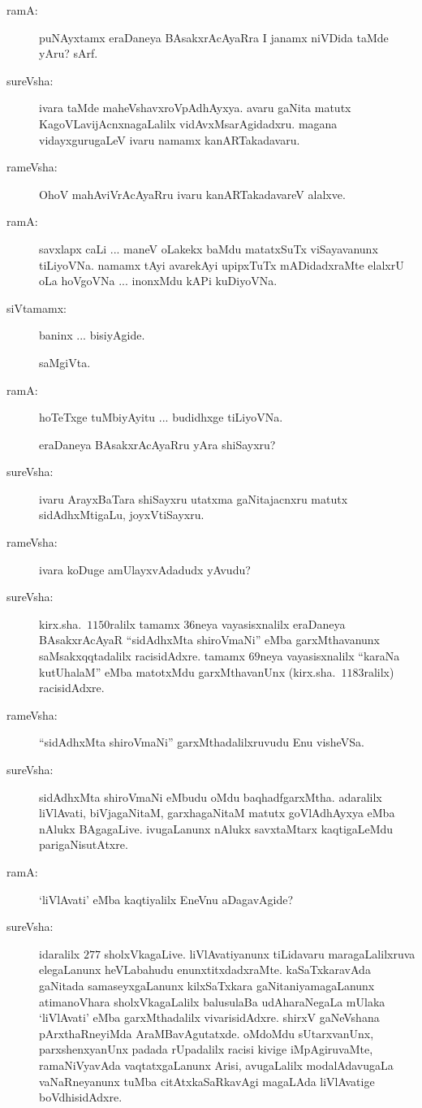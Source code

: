 \begin{description}
\item[ramA:] puNAyxtamx eraDaneya BAsakxrAcAyaRra I janamx niVDida taMde yAru? sArf.

\item[sureVsha:] ivara taMde maheVshavxroVpAdhAyxya. avaru gaNita matutx KagoVLa\-vijAcnxnagaLalilx vidAvxMsarAgidadxru. magana vidayxgurugaLeV ivaru namamx kanARTakadavaru.

\item[rameVsha:] OhoV mahAviVrAcAyaRru ivaru kanARTakadavareV alalxve.

\item[ramA:] savxlapx caLi ... maneV oLakekx baMdu matatxSuTx viSayavanunx tiLiyoVNa. namamx tAyi avarekAyi upipxTuTx mADidadxraMte elalxrU oLa hoVgoVNa ... inonxMdu kAPi kuDiyoVNa.

\item[siVtamamx:] baninx ... bisiyAgide.

saMgiVta.

\item[ramA:] hoTeTxge tuMbiyAyitu ... budidhxge tiLiyoVNa.

eraDaneya BAsakxrAcAyaRru yAra shiSayxru?

\item[sureVsha:] ivaru ArayxBaTara shiSayxru utatxma gaNitajacnxru matutx sidAdhxMtigaLu, joyxVtiSayxru.

\item[rameVsha:] ivara koDuge amUlayxvAdadudx yAvudu?

\item[sureVsha:] kirx.sha.\ $1150$ralilx tamamx $36$neya vayasisxnalilx eraDaneya BAsakxrAcAyaR ``sidAdhxMta shiroVmaNi'' eMba garxMthavanunx saMsakxqqtadalilx racisidAdxre. tamamx $69$neya vayasisxnalilx ``karaNa kutUhalaM'' eMba matotxMdu garxMthavanUnx (kirx.sha.\ $1183$ralilx) racisidAdxre.

\item[rameVsha:] ``sidAdhxMta shiroVmaNi'' garxMthadalilxruvudu Enu visheVSa.

\item[sureVsha:] sidAdhxMta shiroVmaNi eMbudu oMdu baqhadfgarxMtha. adaralilx liVlAvati, biVjagaNitaM, garxhagaNitaM matutx goVlAdhAyxya eMba nAlukx BAgagaLive. ivugaLanunx nAlukx savxtaMtarx kaqtigaLeMdu parigaNisutAtxre.

\item[ramA:] `liVlAvati' eMba kaqtiyalilx EneVnu aDagavAgide?

\item[sureVsha:] idaralilx $277$ sholxVkagaLive. liVlAvatiyanunx tiLidavaru maragaLalilxruva elegaLanunx heVLabahudu enunxtitxdadxraMte. kaSaTxkaravAda gaNitada samaseyx\break gaLanunx kilxSaTxkara gaNitaniyamagaLanunx atimanoVhara sholxVkagaLalilx balu\break sulaBa udAharaNegaLa mUlaka `liVlAvati' eMba garxMthadalilx vivarisidAdxre. shirxV gaNeVshana pArxthaRneyiMda AraMBavAgutatxde. oMdoMdu sUtarxvanUnx,\- parxshenxyanUnx padada rUpadalilx racisi kivige iMpAgiruvaMte, ramaNiVya\-vAda vaqtatxgaLanunx Arisi, avugaLalilx modalAdavugaLa vaNaRneyanunx tuMba citAtxkaSaRkavAgi magaLAda liVlAvatige boVdhisidAdxre.


\end{description}
